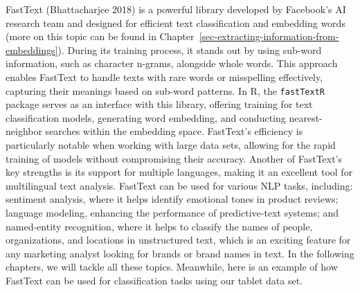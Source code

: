 FastText (Bhattacharjee 2018) is a powerful library developed by
Facebook's AI research team and designed for efficient text
classification and embedding words (more on this topic can be found in
Chapter~\ref{sec-extracting-information-from-embeddings}). During its
training process, it stands out by using sub-word information,
such as character n-grams, alongside whole words. This approach enables
FastText to handle texts with rare words or misspelling effectively,
capturing their meanings based on sub-word patterns. In R, the
\texttt{fastTextR} package serves as an interface with this library,
offering training for text classification models, generating
word embedding, and conducting nearest-neighbor searches within the
embedding space. FastText's efficiency is particularly notable when
working with large data sets, allowing for the rapid training of models without
compromising their accuracy. Another of FastText's key strengths is its
support for multiple languages, making it an excellent tool for
multilingual text analysis. FastText can be used for various NLP
tasks, including: sentiment analysis, where it helps identify emotional
tones in product reviews; language modeling, enhancing the performance
of predictive-text systems; and named-entity recognition, where it helps to classify the names of people, organizations, and locations in
unstructured text, which is an exciting feature for any marketing
analyst looking for brands or brand names in text. In the following
chapters, we will tackle all these topics. Meanwhile, here is an example
of how FastText can be used for classification tasks using our tablet
data set.

